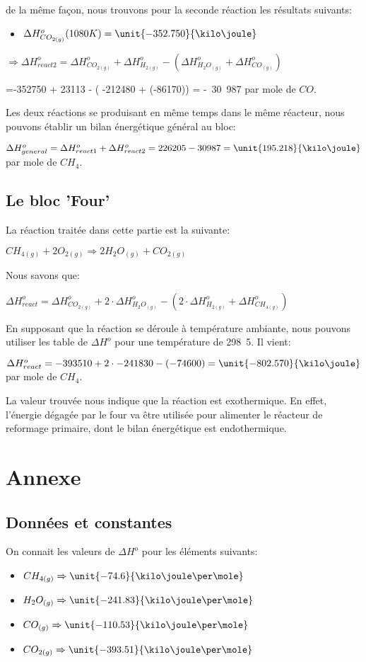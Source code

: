 \documentclass[11pt,a4paper]{report}
\begin{document}
de la même façon, nous trouvons pour la seconde réaction les résultats suivants:

\begin{itemize}
\item{$\Delta H^o_{CO_{2(g)}} (1080K)= \unit{-352.750}{\kilo\joule}$}
\end{itemize}
$\Rightarrow \Delta H^o_{react2}= \Delta H^o_{CO_{2(g)}} + \Delta H^o_{H_{2(g)}} -(\Delta H^o_{H_{2}O_{(g)}} + \Delta H^o_{CO_{(g)}})$

=-352750 + 23113 - ( -212480 + (-86170)) = \unit{-30.987}{\kilo\joule} par mole de $CO$.

Les deux réactions se produisant en même temps dans le même réacteur, nous pouvons établir un bilan énergétique 
général au bloc:


$\Delta H^o_{general}= \Delta H^o_{react1} + \Delta H^o_{react2} = 226205 - 30987 = \unit{195.218}{\kilo\joule}$ par mole de $CH_4$.

\subsection*{Le bloc 'Four'}
La réaction traitée dans cette partie est la suivante:

$CH_{4(g)} + 2O_{2(g)} \Rightarrow 2H_{2}O_{(g)} + CO_{2(g)}$

Nous savons que:

$\Delta H^o_{react} = \Delta H^o_{CO_{2(g)}} + 2\cdot \Delta H^o_{H_{2}O_{(g)}} - (2\cdot \Delta H^o_{H_{2(g)}} + \Delta H^o_{CH_{4(g)}}) $

En supposant que la réaction se déroule à température ambiante, nous pouvons utiliser les table de $\Delta H^o$ pour une
température de \unit{298.5}{\kelvin}. Il vient:

$\Delta H^o_{react} = -393510 + 2\cdot -241830 - (-74600) = \unit{-802.570}{\kilo\joule}$ par mole de $CH_4$.

La valeur trouvée nous indique que la réaction est exothermique. En effet, l'énergie dégagée par le four va être 
utilisée pour alimenter le réacteur de reformage primaire, dont le bilan énergétique est endothermique.
\section*{Annexe}
\subsection*{Données et constantes}
On connait les valeurs de $\Delta H^o$ pour les éléments suivants:
\begin{itemize}
\item{$CH_{4(g)} \Rightarrow \unit{-74.6}{\kilo\joule\per\mole}$}
\item{$H_2O_{(g)} \Rightarrow \unit{-241.83}{\kilo\joule\per\mole}$}
\item{$CO_{(g)} \Rightarrow \unit{-110.53}{\kilo\joule\per\mole}$}
\item{$CO_{2(g)} \Rightarrow \unit{-393.51}{\kilo\joule\per\mole}$}
\end{itemize}
\end{document}
